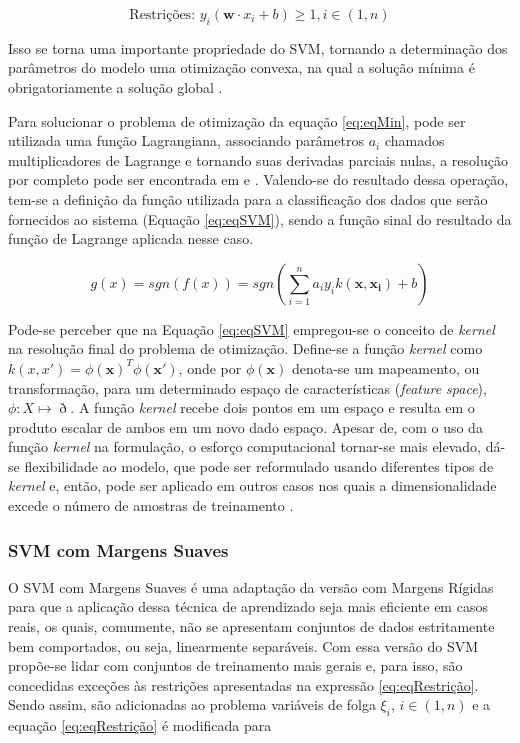 \begin{equation}
\label{eq:eqRestrição}
  \text{Restrições: } y_i(\boldsymbol{w} \cdot x_i + b) \geq 1, i \in (1,n)
\end{equation}

Isso se torna uma importante propriedade do SVM, tornando a determinação dos parâmetros do modelo uma otimização convexa, na qual a solução mínima é obrigatoriamente a solução global .

Para solucionar o problema de otimização da equação \ref{eq:eqMin}, pode ser utilizada uma função Lagrangiana, associando parâmetros $a_i$ chamados multiplicadores de Lagrange e tornando suas derivadas parciais nulas, a resolução por completo pode ser encontrada em  e . Valendo-se do resultado dessa operação, tem-se a definição da função utilizada para a classificação dos dados que serão fornecidos ao sistema (Equação \ref{eq:eqSVM}), sendo a função sinal do resultado da função de Lagrange aplicada nesse caso.

\begin{equation}
\label{eq:eqSVM}
  g(x) = sgn(f(x)) = sgn(\displaystyle\sum_{i=1}^{n}a_iy_ik(\boldsymbol{x},\boldsymbol{x_i})+b)
\end{equation}

Pode-se perceber que na Equação \ref{eq:eqSVM} empregou-se o conceito de \textit{kernel} na resolução final do problema de otimização. Define-se a função \textit{kernel} como $k(x,x') = \phi(\boldsymbol{x})^T\phi(\boldsymbol{x'})$, onde por $\phi(\boldsymbol{x})$ denota-se um mapeamento, ou transformação, para um determinado espaço de características (\textit{feature space}), $\phi:X\mapsto\eth$. A função \textit{kernel} recebe dois pontos em um espaço e resulta em o produto escalar de ambos em um novo dado espaço. Apesar de, com o uso da função \textit{kernel} na formulação, o esforço computacional tornar-se mais elevado, dá-se flexibilidade ao modelo, que pode ser reformulado usando diferentes tipos de \textit{kernel} e, então, pode ser aplicado em outros casos nos quais a dimensionalidade excede o número de amostras de treinamento .

\subsubsection{SVM com Margens Suaves}

O SVM com Margens Suaves é uma adaptação da versão com Margens Rígidas para que a aplicação dessa técnica de aprendizado seja mais eficiente em casos reais, os quais, comumente, não se apresentam conjuntos de dados estritamente bem comportados, ou seja, linearmente separáveis. Com essa versão do SVM propõe-se lidar com conjuntos de treinamento mais gerais e, para isso, são concedidas exceções às restrições apresentadas na expressão \ref{eq:eqRestrição}. Sendo assim, são adicionadas ao problema variáveis de folga $\xi_i$, $i \in (1,n)$ e a equação \ref{eq:eqRestrição} é modificada para

